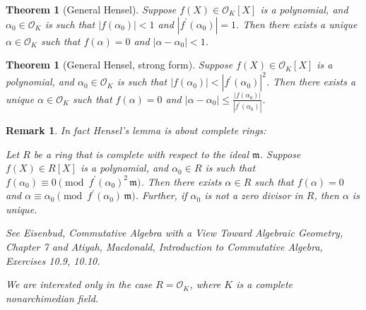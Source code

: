 \documentclass{article}
\renewcommand{\O}{\mathcal{O}}
\theoremstyle{myplain}
\newtheorem{theorem}[proposition]{Theorem}
\theoremstyle{mydefinition}
\newtheorem{remark}[proposition]{Remark}
\begin{document}
\begin{theorem}[General Hensel]
  Suppose $f (X) \in \O_K [X]$ is a polynomial, and $\alpha_0 \in \O_K$ is such
  that $|f (\alpha_0)| < 1$ and $|f^\prime (\alpha_0)| = 1$. Then there exists a
  unique $\alpha \in \O_K$ such that $f (\alpha) = 0$ and
  $|\alpha - \alpha_0| < 1$.
\end{theorem}

\begin{theorem}[General Hensel, strong form]\label{theorem:general-hensel-strong}
  Suppose $f (X) \in \O_K [X]$ is a polynomial, and $\alpha_0 \in \O_K$ is such
  that $|f (\alpha_0)| < |f^\prime (\alpha_0)|^2$. Then there exists a unique
  $\alpha \in \O_K$ such that $f (\alpha) = 0$ and
  $|\alpha - \alpha_0| \le \frac{|f(\alpha_0)|}{|f^\prime (\alpha_0)|}$.
\end{theorem}

\begin{remark}
  In fact Hensel's lemma is about complete \emph{rings}:

  \noindent\emph{Let $R$ be a ring that is complete with respect to the ideal
    $\mathfrak{m}$. Suppose $f (X) \in R [X]$ is a polynomial, and
    $\alpha_0 \in R$ is such that
    $f (\alpha_0) \equiv 0 \pmod{f^\prime (\alpha_0)^2\,\mathfrak{m}}$. Then
    there exists $\alpha \in R$ such that $f (\alpha) = 0$ and
    $\alpha \equiv \alpha_0 \pmod{f^\prime (\alpha_0)\,\mathfrak{m}}$. Further,
    if $\alpha_0$ is not a zero divisor in $R$, then $\alpha$ is unique.}

  See \emph{Eisenbud, Commutative Algebra with a View Toward Algebraic Geometry,
    Chapter 7} and \emph{Atiyah, Macdonald, Introduction to Commutative Algebra,
    Exercises 10.9, 10.10}.

  We are interested only in the case $R = \O_K$, where $K$ is a complete
  nonarchimedian field.
\end{remark}
\end{document}
